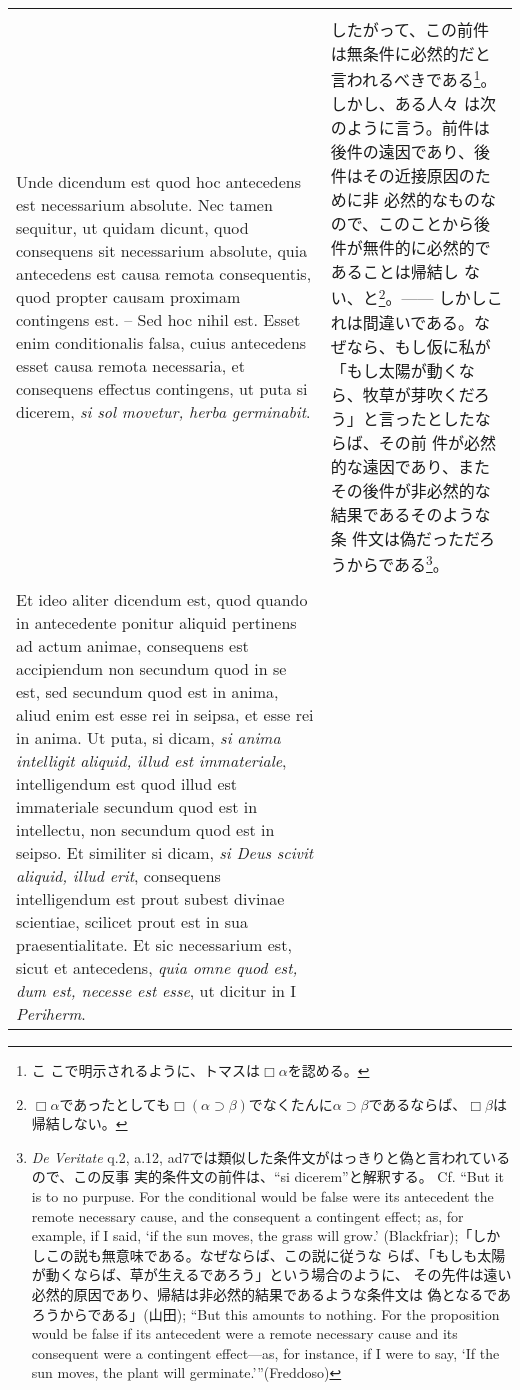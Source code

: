 \documentclass[10pt]{jsarticle} %
\begin{document}
\begin{longtable}{p{21em}p{21em}}
\\\\


Unde dicendum est quod hoc antecedens est necessarium absolute. Nec
tamen sequitur, ut quidam dicunt, quod consequens sit necessarium
absolute, quia antecedens est causa remota consequentis, quod propter
causam proximam contingens est. -- Sed hoc nihil est. Esset enim
conditionalis falsa, cuius antecedens esset causa remota necessaria,
et consequens effectus contingens, ut puta si dicerem, {\itshape si
sol movetur, herba germinabit}.

&

したがって、この前件は無条件に必然的だと言われるべきである\footnote{こ
こで明示されるように、トマスは$\Box \alpha$を認める。}。しかし、ある人々
は次のように言う。前件は後件の遠因であり、後件はその近接原因のために非
必然的なものなので、このことから後件が無件的に必然的であることは帰結し
ない、と\footnote{$\Box \alpha$であったとしても$\Box(\alpha \supset
\beta)$でなくたんに$\alpha \supset \beta$であるならば、$\Box \beta$は
帰結しない。}。------ しかしこれは間違いである。なぜなら、もし仮に私が
「もし太陽が動くなら、牧草が芽吹くだろう」と言ったとしたならば、その前
件が必然的な遠因であり、またその後件が非必然的な結果であるそのような条
件文は偽だっただろうからである\footnote{{\itshape De Veritate} q.2,
a.12, ad7では類似した条件文がはっきりと偽と言われているので、この反事
実的条件文の前件は、``si dicerem''と解釈する。 Cf. ``But it is to no
purpuse. For the conditional would be false were its antecedent the
remote necessary cause, and the consequent a contingent effect; as,
for example, if I said, `if the sun moves, the grass will grow.'
(Blackfriar);「しかしこの説も無意味である。なぜならば、この説に従うな
らば、「もしも太陽が動くならば、草が生えるであろう」という場合のように、
その先件は遠い必然的原因であり、帰結は非必然的結果であるような条件文は
偽となるであろうからである」(山田); ``But this amounts to nothing. For
the proposition would be false if its antecedent were a remote
necessary cause and its consequent were a contingent effect—as, for
instance, if I were to say, ‘If the sun moves, the plant will
germinate.’''(Freddoso)}。

\\\\


Et ideo aliter dicendum est, quod quando in antecedente ponitur
aliquid pertinens ad actum animae, consequens est accipiendum non
secundum quod in se est, sed secundum quod est in anima, aliud enim
est esse rei in seipsa, et esse rei in anima. Ut puta, si dicam,
{\itshape si anima intelligit aliquid, illud est immateriale},
intelligendum est quod illud est immateriale secundum quod est in
intellectu, non secundum quod est in seipso. Et similiter si dicam,
{\itshape si Deus scivit aliquid, illud erit}, consequens
intelligendum est prout subest divinae scientiae, scilicet prout est
in sua praesentialitate. Et sic necessarium est, sicut et antecedens,
{\itshape quia omne quod est, dum est, necesse est esse}, ut dicitur
in I {\itshape Periherm}.



\end{longtable}
\end{document}
